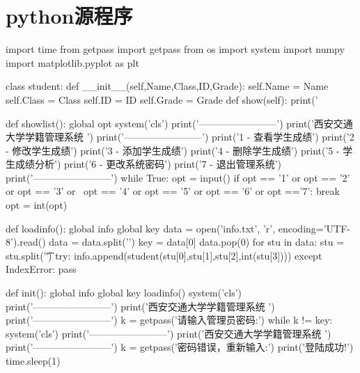 \documentclass{article}
\begin{document}
\section{python源程序}
\begin{python}
import time
from getpass import getpass
from os import system
import numpy
import matplotlib.pyplot as plt

class student:
    def __init__(self,Name,Class,ID,Grade):
        self.Name = Name
        self.Class = Class
        self.ID = ID
        self.Grade = Grade
    def show(self):
        print('%

def showlist():
    global opt
    system('cls')
    print('------------------------')
    print('西安交通大学学籍管理系统     ')
    print('------------------------')
    print('1 - 查看学生成绩')
    print('2 - 修改学生成绩')
    print('3 - 添加学生成绩')
    print('4 - 删除学生成绩')
    print('5 - 学生成绩分析')
    print('6 - 更改系统密码')
    print('7 - 退出管理系统')
    print('------------------------')
    while True:
        opt = input()
        if opt == '1' or opt == '2' or opt == '3' or \
        opt == '4' or opt == '5' or opt == '6' or opt =='7':
            break
    opt = int(opt)

def loadinfo():
    global info
    global key
    data = open('info.txt', 'r', encoding='UTF-8').read()
    data = data.split('\n')
    key = data[0]
    data.pop(0)
    for stu in data:
        stu = stu.split('\t')
        try:
            info.append(student(stu[0],stu[1],stu[2],int(stu[3])))
        except IndexError:
            pass

def init():
    global info
    global key
    loadinfo()
    system('cls')
    print('------------------------')
    print('西安交通大学学籍管理系统     ')
    print('------------------------')
    k = getpass('请输入管理员密码:')
    while k != key:
        system('cls')
        print('------------------------')
        print('西安交通大学学籍管理系统     ')
        print('------------------------')
        k = getpass('密码错误，重新输入:')
    print('登陆成功!')
    time.sleep(1)


\end{python}
\end{document}
